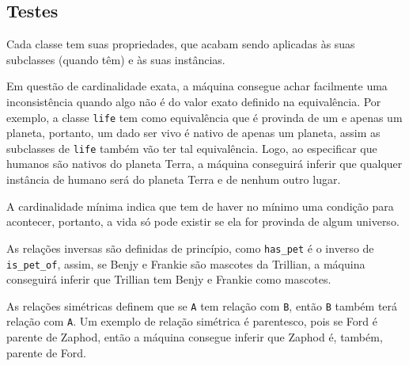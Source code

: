 \documentclass{article}
\begin{document}
        \subsection*{Testes}
            Cada classe tem suas propriedades, que acabam sendo aplicadas às
            suas subclasses (quando têm) e às suas instâncias.
            
            Em questão de cardinalidade exata, a máquina consegue achar
            facilmente uma inconsistência quando algo não é do valor exato
            definido na equivalência. Por exemplo, a classe \texttt{life} tem
            como equivalência que é provinda de um e apenas um planeta,
            portanto, um dado ser vivo é nativo de apenas um planeta, assim as
            subclasses de \texttt{life} também vão ter tal equivalência. Logo,
            ao especificar que humanos são nativos do planeta Terra, a máquina
            conseguirá inferir que qualquer instância de humano será do planeta
            Terra e de nenhum outro lugar.
            
            A cardinalidade mínima indica que tem de haver no mínimo uma
            condição para acontecer, portanto, a vida só pode existir se ela
            for provinda de algum universo.
            
            As relações inversas são definidas de princípio, como
            \texttt{has\_pet} é o inverso de \texttt{is\_pet\_of}, assim, se
            Benjy e Frankie são mascotes da Trillian, a máquina conseguirá
            inferir que Trillian tem Benjy e Frankie como mascotes.
            
            As relações simétricas definem que se \texttt{A} tem relação com
            \texttt{B}, então \texttt{B} também terá relação com \texttt{A}. Um
            exemplo de relação simétrica é parentesco, pois se Ford é parente
            de Zaphod, então a máquina consegue inferir que Zaphod é, também,
            parente de Ford.
\end{document}

